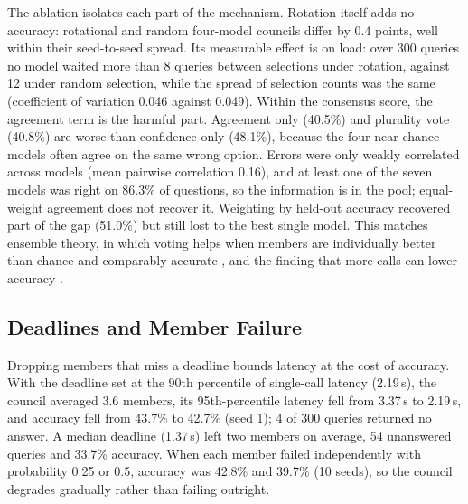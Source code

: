 The ablation isolates each part of the mechanism. Rotation itself adds no accuracy: rotational and random four-model councils differ by 0.4 points, well within their seed-to-seed spread. Its measurable effect is on load: over 300 queries no model waited more than 8 queries between selections under rotation, against 12 under random selection, while the spread of selection counts was the same (coefficient of variation 0.046 against 0.049). Within the consensus score, the agreement term is the harmful part. Agreement only (40.5\%) and plurality vote (40.8\%) are worse than confidence only (48.1\%), because the four near-chance models often agree on the same wrong option. Errors were only weakly correlated across models (mean pairwise correlation 0.16), and at least one of the seven models was right on 86.3\% of questions, so the information is in the pool; equal-weight agreement does not recover it. Weighting by held-out accuracy recovered part of the gap (51.0\%) but still lost to the best single model. This matches ensemble theory, in which voting helps when members are individually better than chance and comparably accurate \cite{dietterich2000ensemble}, and the finding that more calls can lower accuracy \cite{chen2024calls}.

\subsection{Deadlines and Member Failure}
Dropping members that miss a deadline bounds latency at the cost of accuracy. With the deadline set at the 90th percentile of single-call latency (2.19\,s), the council averaged 3.6 members, its 95th-percentile latency fell from 3.37\,s to 2.19\,s, and accuracy fell from 43.7\% to 42.7\% (seed 1); 4 of 300 queries returned no answer. A median deadline (1.37\,s) left two members on average, 54 unanswered queries and 33.7\% accuracy. When each member failed independently with probability 0.25 or 0.5, accuracy was 42.8\% and 39.7\% (10 seeds), so the council degrades gradually rather than failing outright.
